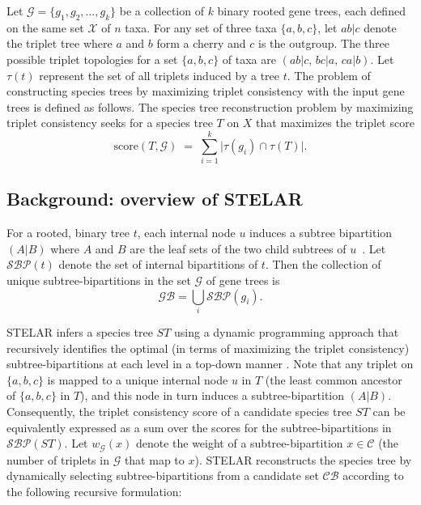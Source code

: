 \documentclass[10pt,a4paper]{article}
\newcommand{\add}[1]{{\color{blue} #1}}
\newcommand{\add}[1]{{\color{blue} #1}}
\begin{document}
Let $\mathcal{G} = \{g_1, g_2, \ldots, g_k\}$ be a collection of $k$ binary rooted gene trees, each defined on the same set $\mathcal{X}$ of $n$ taxa. For any set of three taxa $\{a,b,c\}$, let $ab|c$ denote the triplet tree where $a$ and $b$ form a cherry and $c$ is the outgroup. The three possible triplet topologies for a set $\{a,b,c\}$ of taxa are $(ab|c,\, bc|a,\, ca|b)$. Let $\tau(t)$ represent the set of all triplets induced by a tree $t$. The problem of constructing species trees by maximizing triplet consistency with the input gene trees is defined as follows. The species tree reconstruction problem by maximizing triplet consistency seeks for a species tree $T$ on $X$ that maximizes the triplet score
\[
\mathrm{score}(T,\mathcal{G}) \;=\; \sum_{i=1}^{k} \big|\tau(g_i)\cap\tau(T)\big|.
\]



\subsection{Background: overview of STELAR}

For a rooted, binary tree $t$, each internal node $u$ induces a subtree bipartition $(A|B)$ where $A$ and $B$ are the leaf sets of the two child subtrees of $u$~\cite{mgd-PSB}. Let$\mathcal{SBP}(t)$ denote the set of internal bipartitions of $t$. Then the collection of unique subtree-bipartitions in the set  $\mathcal{G}$ of gene trees is  
\[
\mathcal{GB} = \bigcup_{i} \mathcal{SBP}(g_i).
\]  

STELAR infers a species tree $ST$ using a dynamic programming approach that recursively identifies the optimal (in terms of maximizing the triplet consistency) subtree-bipartitions at each level in a top-down manner \cite{stelar}. Note that any triplet on $\{a,b,c\}$ is mapped to a unique internal node $u$ in $T$ (the least common ancestor of $\{a,b,c\}$ in $T$), and this node in turn induces a subtree-bipartition $(A|B)$. Consequently, the triplet consistency score of a candidate species tree $ST$ can be equivalently expressed as a sum over the scores for the subtree-bipartitions in $\mathcal{SBP}(ST)$. %
Let $w_{\mathcal{G}}(x)$ denote the weight of a subtree-bipartition $x\in\mathcal{C}$ (the number of  triplets in $\mathcal{G}$ that map to $x$). %
STELAR reconstructs the species tree by dynamically selecting subtree-bipartitions from a candidate set $\mathcal{CB}$ according to the following recursive formulation:  
\end{document}
